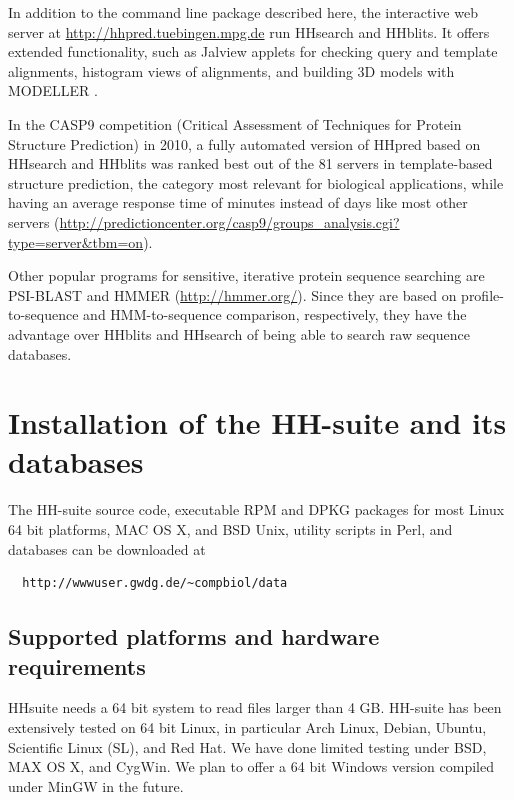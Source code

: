 \documentclass[11pt,a4paper]{article}
\begin{document}
In addition to the command line package described here, the interactive web server at \url{http://hhpred.tuebingen.mpg.de} \cite{Soding:2005b, Hildebrand:2009} run HHsearch and HHblits. It offers extended functionality, such as Jalview applets for checking query and template alignments, histogram views of alignments, and building 3D models with MODELLER \cite{Sali:1993}. 

In the CASP9 competition (Critical Assessment of Techniques for Protein Structure Prediction) in 2010, a fully automated version of HHpred based on HHsearch and HHblits was ranked best out of the 81 servers in template-based structure prediction, the category most relevant for biological applications, while having an average response time of minutes instead of days like most other servers \cite{Mariani:2011} (\url{http://predictioncenter.org/casp9/groups_analysis.cgi?type=server&tbm=on}). 

Other popular programs for sensitive, iterative protein sequence searching are PSI-BLAST \cite{Altschul:1997} and HMMER (\url{http://hmmer.org/}). Since they are based on profile-to-sequence and HMM-to-sequence comparison, respectively, they have the advantage over HHblits and HHsearch of being able to search raw sequence databases.


\section{Installation of the HH-suite and its databases}

The HH-suite source code, executable RPM and DPKG packages for most Linux 64 bit platforms, MAC OS X, and BSD Unix, utility scripts in Perl, and databases can be downloaded at
\begin{verbatim}
  http://wwwuser.gwdg.de/~compbiol/data
\end{verbatim}

\subsection{Supported platforms and hardware requirements} \label{installation}

HHsuite needs a 64 bit system to read files larger than 4 GB. HH-suite has been extensively tested on 64 bit Linux, in particular Arch Linux, Debian, Ubuntu, Scientific Linux (SL), and Red Hat. We have done limited testing under BSD, MAX OS X, and CygWin. We plan to offer a 64 bit Windows version compiled under MinGW in the future.
\end{document}
